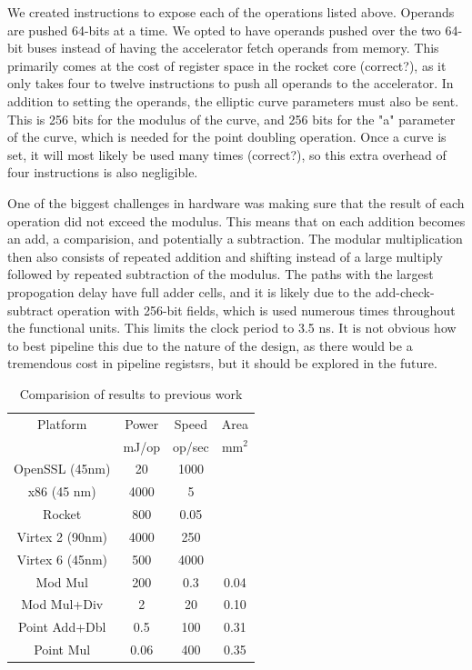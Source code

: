 \documentclass[twocolumn]{article}
\begin{document}
We created instructions to expose each of the operations listed
above. Operands are pushed 64-bits at a time. We opted to have
operands pushed over the two 64-bit buses instead of having the
accelerator fetch operands from memory. This primarily comes at the
cost of register space in the rocket core (correct?), as it only takes
four to twelve instructions to push all operands to the
accelerator. In addition to setting the operands, the elliptic curve
parameters must also be sent. This is 256 bits for the modulus of the
curve, and 256 bits for the "a" parameter of the curve, which is
needed for the point doubling operation. Once a curve is set, it will
most likely be used many times (correct?), so this extra overhead of
four instructions is also negligible.

One of the biggest challenges in hardware was making sure that the
result of each operation did not exceed the modulus. This means that
on each addition becomes an add, a comparision, and potentially a
subtraction. The modular multiplication then also consists of repeated
addition and shifting instead of a large multiply followed by repeated
subtraction of the modulus. The paths with the largest propogation
delay have full adder cells, and it is likely due to the
add-check-subtract operation with 256-bit fields, which is used
numerous times throughout the functional units. This limits the clock
period to 3.5 ns. It is not obvious how to best pipeline this due to
the nature of the design, as there would be a tremendous cost in
pipeline registsrs, but it should be explored in the future.

\begin{table}[ht]
  \begin{center}
    \begin{tabular}{c|ccc}
      Platform        & Power & Speed  & Area \\
                      & mJ/op & op/sec & mm$^2$ \\
      \hline
      OpenSSL (45nm)  & 20    & 1000   &      \\
      x86 (45 nm)     & 4000  & 5      &      \\
      Rocket          & 800   & 0.05   &      \\
      Virtex 2 (90nm) & 4000  & 250    &      \\
      Virtex 6 (45nm) & 500   & 4000   &      \\
      \hline
      Mod Mul         & 200   & 0.3    & 0.04 \\
      Mod Mul+Div     & 2     & 20     & 0.10 \\
      Point Add+Dbl   & 0.5   & 100    & 0.31 \\
      Point Mul       & 0.06  & 400    & 0.35 \\
    \end{tabular}
  \end{center}

  \caption{Comparision of results to previous work
    \label{results}}
\end{table}
\end{document}
